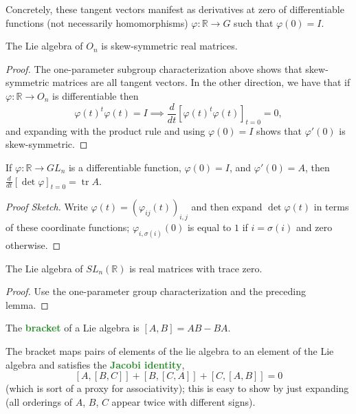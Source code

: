 \documentclass[10pt]{scrartcl}
\providecommand{\RR}{\mathbb R}
\providecommand{\opname}{\operatorname}
\providecommand{\vocab}[1]{{\textbf{\textcolor{ForestGreen}{#1}}}}
\begin{document}
Concretely, these tangent vectors manifest as derivatives at zero
of differentiable functions (not necessarily homomorphisms)
$\varphi\colon\RR\to G$ such that $\varphi(0) = I$.

\begin{prop}
	The Lie algebra of $O_n$ is skew-symmetric real matrices.
\end{prop}

\begin{proof}
	The one-parameter subgroup characterization above shows that
	skew-symmetric matrices are all tangent vectors.
	In the other direction, we have that if $\varphi\colon\RR\to O_n$
	is differentiable then
	\[\varphi(t)^t\varphi(t) = I
	\implies \frac{d}{dt}[\varphi(t)^t \varphi(t)]_{t=0} = 0,\]
	and expanding with the product rule and using $\varphi(0) = I$
	shows that $\varphi'(0)$ is skew-symmetric.
\end{proof}

\begin{lemma}
	If $\varphi\colon\RR\to GL_n$ is a differentiable function,
	$\varphi(0) = I$, and $\varphi'(0) = A$,
	then $\frac{d}{dt} [\det\varphi]_{t=0} = \opname{tr}A$.
\end{lemma}

\begin{proof}[Proof Sketch]
	Write $\varphi(t) = \left(\varphi_{ij}(t)\right)_{i,j}$
	and then expand $\det\varphi(t)$ in terms of these coordinate functions;
	$\varphi_{i,\sigma(i)}(0)$ is equal to $1$ if $i = \sigma(i)$
	and zero otherwise.
\end{proof}

\begin{prop}
	The Lie algebra of $SL_n(\RR)$ is real matrices with trace zero.
\end{prop}

\begin{proof}
	Use the one-parameter group characterization and the preceding lemma.
\end{proof}

\begin{definition}
	The \vocab{bracket} of a Lie algebra is $[A,B] = AB - BA$.
\end{definition}

The bracket maps pairs of elements of the lie algebra
to an element of the Lie algebra and satisfies the \vocab{Jacobi identity},
\[[A,[B,C]] + [B,[C,A]] + [C,[A,B]] = 0\]
(which is sort of a proxy for associativity); this is easy to show
by just expanding (all orderings of $A$, $B$, $C$ appear twice
with different signs).
\end{document}

